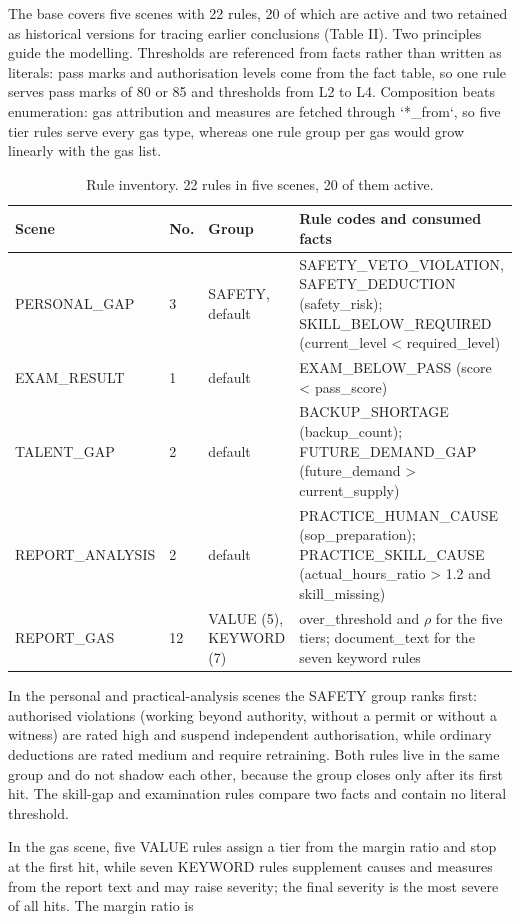 \documentclass[conference]{IEEEtran}
\begin{document}
The base covers five scenes with 22 rules, 20 of which are active and two retained as historical versions for tracing earlier conclusions (Table II). Two principles guide the modelling. Thresholds are referenced from facts rather than written as literals: pass marks and authorisation levels come from the fact table, so one rule serves pass marks of 80 or 85 and thresholds from L2 to L4. Composition beats enumeration: gas attribution and measures are fetched through `*\_from`, so five tier rules serve every gas type, whereas one rule group per gas would grow linearly with the gas list.


\begin{table}[t]
\caption{Rule inventory. 22 rules in five scenes, 20 of them active.}
\centering
\footnotesize
\begin{tabular}{@{}p{}p{}p{}p{}@{}}
\hline
\textbf{Scene} & \textbf{No.} & \textbf{Group} & \textbf{Rule codes and consumed facts} \\ \hline
PERSONAL\_GAP & 3 & SAFETY, default & SAFETY\_VETO\_VIOLATION, SAFETY\_DEDUCTION (safety\_risk); SKILL\_BELOW\_REQUIRED (current\_level < required\_level) \\
EXAM\_RESULT & 1 & default & EXAM\_BELOW\_PASS (score < pass\_score) \\
TALENT\_GAP & 2 & default & BACKUP\_SHORTAGE (backup\_count); FUTURE\_DEMAND\_GAP (future\_demand > current\_supply) \\
REPORT\_ANALYSIS & 2 & default & PRACTICE\_HUMAN\_CAUSE (sop\_preparation); PRACTICE\_SKILL\_CAUSE (actual\_hours\_ratio > 1.2 and skill\_missing) \\
REPORT\_GAS & 12 & VALUE (5), KEYWORD (7) & over\_threshold and $\rho$ for the five tiers; document\_text for the seven keyword rules \\
\hline
\end{tabular}
\end{table}

In the personal and practical-analysis scenes the SAFETY group ranks first: authorised violations (working beyond authority, without a permit or without a witness) are rated high and suspend independent authorisation, while ordinary deductions are rated medium and require retraining. Both rules live in the same group and do not shadow each other, because the group closes only after its first hit. The skill-gap and examination rules compare two facts and contain no literal threshold.


In the gas scene, five VALUE rules assign a tier from the margin ratio and stop at the first hit, while seven KEYWORD rules supplement causes and measures from the report text and may raise severity; the final severity is the most severe of all hits. The margin ratio is
\end{document}
